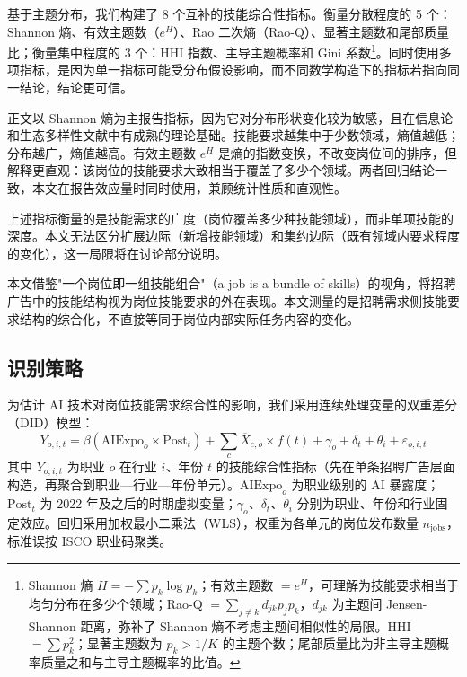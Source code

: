 \documentclass[12pt, a4paper]{article}
\begin{document}
基于主题分布，我们构建了 8 个互补的技能综合性指标。衡量分散程度的 5 个：Shannon 熵、有效主题数（$e^H$）、Rao 二次熵（Rao-Q）、显著主题数和尾部质量比；衡量集中程度的 3 个：HHI 指数、主导主题概率和 Gini 系数\footnote{Shannon 熵 $H = -\sum p_k \log p_k$；有效主题数 $= e^H$，可理解为技能要求相当于均匀分布在多少个领域；Rao-Q $= \sum_{j \neq k} d_{jk} p_j p_k$，$d_{jk}$ 为主题间 Jensen-Shannon 距离，弥补了 Shannon 熵不考虑主题间相似性的局限。HHI $= \sum p_k^2$；显著主题数为 $p_k > 1/K$ 的主题个数；尾部质量比为非主导主题概率质量之和与主导主题概率的比值。}。同时使用多项指标，是因为单一指标可能受分布假设影响，而不同数学构造下的指标若指向同一结论，结论更可信。

正文以 Shannon 熵为主报告指标，因为它对分布形状变化较为敏感，且在信息论和生态多样性文献中有成熟的理论基础。技能要求越集中于少数领域，熵值越低；分布越广，熵值越高。有效主题数 $e^H$ 是熵的指数变换，不改变岗位间的排序，但解释更直观：该岗位的技能要求大致相当于覆盖了多少个领域。两者回归结论一致，本文在报告效应量时同时使用，兼顾统计性质和直观性。

上述指标衡量的是技能需求的广度（岗位覆盖多少种技能领域），而非单项技能的深度。本文无法区分扩展边际（新增技能领域）和集约边际（既有领域内要求程度的变化），这一局限将在讨论部分说明。

本文借鉴"一个岗位即一组技能组合"（a job is a bundle of skills）的视角，将招聘广告中的技能结构视为岗位技能要求的外在表现。本文测量的是招聘需求侧技能要求结构的综合化，不直接等同于岗位内部实际任务内容的变化。

\subsection{识别策略}

为估计 AI 技术对岗位技能需求综合性的影响，我们采用连续处理变量的双重差分（DID）模型：
\begin{equation}
  Y_{o,i,t} = \beta(\text{AIExpo}_o \times \text{Post}_t) + \sum_{c} \overline{X}_{c,o} \times f(t) + \gamma_o + \delta_t + \theta_i + \varepsilon_{o,i,t}
\end{equation}
其中 $Y_{o,i,t}$ 为职业 $o$ 在行业 $i$、年份 $t$ 的技能综合性指标（先在单条招聘广告层面构造，再聚合到职业—行业—年份单元）。$\text{AIExpo}_o$ 为职业级别的 AI 暴露度；$\text{Post}_t$ 为 2022 年及之后的时期虚拟变量；$\gamma_o$、$\delta_t$、$\theta_i$ 分别为职业、年份和行业固定效应。回归采用加权最小二乘法（WLS），权重为各单元的岗位发布数量 $n_{\text{jobs}}$，标准误按 ISCO 职业码聚类。
\end{document}
